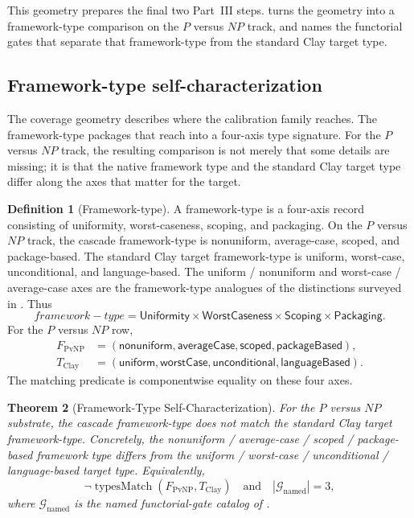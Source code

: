 \documentclass[11pt]{article}
\newcommand{\FType}{framework-type}
\newtheorem{theorem}{Theorem}[section]
\theoremstyle{definition}
\newtheorem{definition}[theorem]{Definition}
\begin{document}
This geometry prepares the final two Part~III steps.
 turns the geometry
into a framework-type comparison on the \(P\) versus \(NP\) track,
and  names the functorial
gates that separate that framework-type from the standard Clay
target type.

\subsection{Framework-type self-characterization}
\label{sec:calibration:framework-type-self-char}

The coverage geometry describes where the calibration family reaches.
The framework-type packages that reach into a four-axis type signature.
For the \(P\) versus \(NP\) track, the resulting comparison is not merely
that some details are missing; it is that the native framework type and
the standard Clay target type differ along the axes that matter for the
target.

\begin{definition}[Framework-type]\label{def:framework-type}
A \FType{} is a four-axis record consisting of uniformity,
worst-caseness, scoping, and packaging.  On the \(P\) versus \(NP\)
track, the cascade framework-type is nonuniform, average-case, scoped,
and package-based.  The standard Clay target framework-type is uniform,
worst-case, unconditional, and language-based.  The uniform /
nonuniform and worst-case / average-case axes are the framework-type
analogues of the distinctions surveyed in \cite{Impagliazzo1995FiveWorlds}.
Thus
\[
  \FType
  =
  \mathsf{Uniformity}\times
  \mathsf{WorstCaseness}\times
  \mathsf{Scoping}\times
  \mathsf{Packaging}.
\]
For the \(P\) versus \(NP\) row,
\[
\begin{aligned}
  F_{\mathrm{PvNP}}
  &=
  (\mathsf{nonuniform},\mathsf{averageCase},
    \mathsf{scoped},\mathsf{packageBased}),\\
  T_{\mathrm{Clay}}
  &=
  (\mathsf{uniform},\mathsf{worstCase},
    \mathsf{unconditional},\mathsf{languageBased}).
\end{aligned}
\]
The matching predicate is componentwise equality on these four axes.
\end{definition}

\begin{theorem}[Framework-Type Self-Characterization]\label{thm:framework-type-self-char}
For the \(P\) versus \(NP\) substrate, the cascade framework-type does
not match the standard Clay target framework-type.  Concretely, the
nonuniform / average-case / scoped / package-based framework type differs
from the uniform / worst-case / unconditional / language-based target
type.
Equivalently,
\[
  \neg\operatorname{typesMatch}(F_{\mathrm{PvNP}},T_{\mathrm{Clay}})
  \quad\text{and}\quad
  |\mathcal G_{\mathrm{named}}|=3,
\]
where \(\mathcal G_{\mathrm{named}}\) is the named functorial-gate
catalog of .
\end{theorem}
\end{document}
